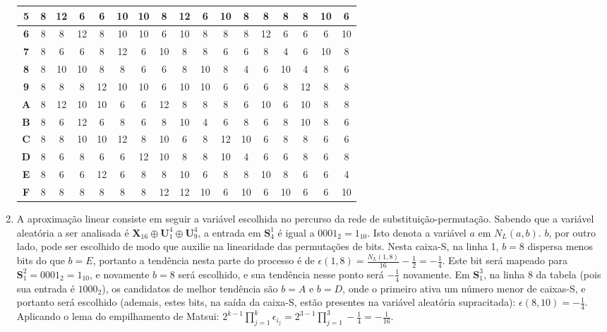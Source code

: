 \documentclass{article}
\begin{document}
\begin{enumerate}
\begin{tabular}{|c|c|c|c|c|c|c|c|c|c|c|c|c|c|c|c|c|}
\textbf{5} & 8 & 12 & 6 & 6 & 10 & 10 & 8 & 12 & 6 & 10 & 8 & 8 & 8 & 8 & 10 & 6 \\ \hline
\textbf{6} & 8 & 8 & 12 & 8 & 10 & 10 & 6 & 10 & 8 & 8 & 8 & 12 & 6 & 6 & 6 & 10 \\ \hline
\textbf{7} & 8 & 6 & 6 & 8 & 12 & 6 & 10 & 8 & 8 & 6 & 6 & 8 & 4 & 6 & 10 & 8 \\ \hline
\textbf{8} & 8 & 10 & 10 & 8 & 8 & 6 & 6 & 8 & 10 & 8 & 4 & 6 & 10 & 4 & 8 & 6 \\ \hline
\textbf{9} & 8 & 8 & 8 & 12 & 10 & 10 & 6 & 10 & 10 & 6 & 6 & 6 & 8 & 12 & 8 & 8 \\ \hline
\textbf{A} & 8 & 12 & 10 & 10 & 6 & 6 & 12 & 8 & 8 & 8 & 6 & 10 & 6 & 10 & 8 & 8 \\ \hline
\textbf{B} & 8 & 6 & 12 & 6 & 8 & 6 & 8 & 10 & 4 & 6 & 8 & 6 & 8 & 10 & 8 & 6 \\ \hline
\textbf{C} & 8 & 8 & 10 & 10 & 12 & 8 & 10 & 6 & 8 & 12 & 10 & 6 & 8 & 8 & 6 & 6 \\ \hline
\textbf{D} & 8 & 6 & 8 & 6 & 6 & 12 & 10 & 8 & 8 & 10 & 4 & 6 & 6 & 8 & 6 & 8 \\ \hline
\textbf{E} & 8 & 6 & 6 & 12 & 6 & 8 & 8 & 10 & 6 & 8 & 8 & 10 & 8 & 6 & 6 & 4 \\ \hline
\textbf{F} & 8 & 8 & 8 & 8 & 8 & 8 & 12 & 12 & 10 & 6 & 10 & 6 & 10 & 6 & 6 & 10 \\ \hline
\end{tabular}
\item A aproximação linear consiste em seguir a variável escolhida no percurso da rede de substituição-permutação. Sabendo que a variável aleatória a ser analisada é $\textbf{X}_{16} \oplus \textbf{U}^{4}_{1} \oplus \textbf{U}^{4}_{9}$, a entrada em $\textbf{S}^{1}_{4}$ é igual a $0001_{2} = 1_{10}$. Isto denota a variável $a$ em $N_{L}(a, b)$. $b$, por outro lado, pode ser escolhido de modo que auxilie na linearidade das permutações de bits. Nesta caixa-S, na linha 1, $b = 8$ dispersa menos bits do que $b = E$, portanto a tendência nesta parte do processo é de $\epsilon(1, 8) = \frac{N_{L}(1, 8)}{16} - \frac{1}{2} = -\frac{1}{4}.$ Este bit será mapeado para $\textbf{S}^{2}_{1} = 0001_{2} = 1_{10}$, e novamente $b = 8$ será escolhido, e sua tendência nesse ponto será $-\frac{1}{4}$ novamente. Em $\textbf{S}^{3}_{1}$, na linha 8 da tabela (pois sua entrada é $1000_{2}$), os candidatos de melhor tendência são $b = A$ e $b = D$, onde o primeiro ativa um número menor de caixas-S, e portanto será escolhido (ademais, estes bits, na saída da caixa-S, estão presentes na variável aleatória supracitada): $\epsilon(8, 10) = -\frac{1}{4}$. Aplicando o lema do empilhamento de Matsui: $2^{k-1} \prod_{j=1}^{k} \epsilon_{i_{j}} = 2^{3-1} \prod_{j=1}^{3} -\frac{1}{4} = -\frac{1}{16}.$

\end{enumerate}
\end{document}
